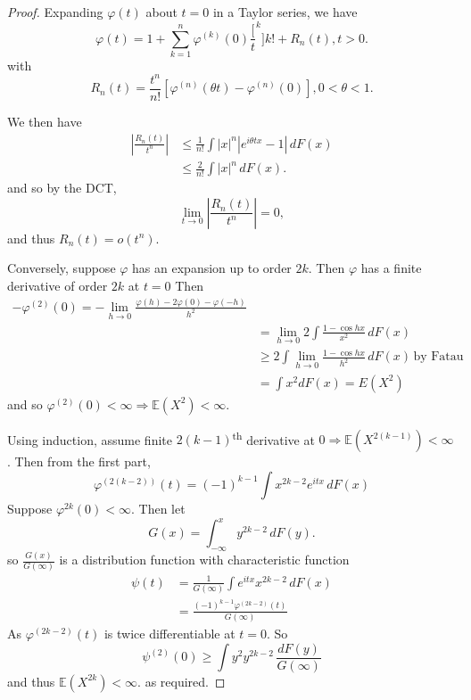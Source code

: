 \documentclass[10pt, oneside, reqno]{amsart}
\theoremstyle{plain}%
\theoremstyle{definition}
\theoremstyle{remark}
\renewcommand{\phi}{\varphi}
\newcommand{\E}{\mathbb{E}}
\newcommand{\sumnk}{\sum_{k=1}^n}
\begin{document}
\begin{proof}
    Expanding $\phi(t)$ about $t = 0$ in a Taylor series, we have \[
        \phi(t) = 1 + \sumnk \phi^{(k)}(0) \frac[t^k]{k!} + R_n(t), t > 0.
    \] with \[
        R_n(t) = \frac{t^n}{n!} \left[ \phi^{(n)}(\theta t) - \phi^{(n)}(0) \right], 0 < \theta < 1.
    \]  
    
    We then have 
    \begin{align*}
        \left| \frac{R_n(t)}{t^n} \right| &\leq \frac{1}{n!} \int |x|^n | e^{i\theta tx} - 1 | \, dF(x) \\
        &\leq \frac{2}{n!} \int |x|^n \, dF(x).
    \end{align*} and so by the DCT, \[
        \lim_{t \rightarrow 0} \left| \frac{R_n(t)}{t^n} \right| = 0, 
    \] and thus $R_n(t) = o(t^n)$.
    
    Conversely, suppose $\phi$ has an expansion up to order $2k$.  Then $\phi$ has a finite derivative of order $2k$ at $t = 0$  Then \begin{align*}
        -\phi^{(2)}(0) = -\lim_{h \rightarrow 0} \frac{ \phi(h) - 2 \phi(0) - \phi(-h)}{h^2} \\
        &= \lim_{h \rightarrow 0} 2 \int \frac{1 - \cos hx}{x^2} \, dF(x) \\
        &\geq 2 \int \lim_{h \rightarrow 0} \frac{1 - \cos hx}{h^2} \, dF(x) \, \text{by Fatau} \\
        &= \int x^2 dF(x) = E(X^2)
    \end{align*} and so $\phi^{(2)}(0) < \infty \Rightarrow \E(X^2) < \infty$.    
    
    Using induction, assume finite $2(k-1)$\textsuperscript{th} derivative at $0 \Rightarrow \E(X^{2(k-1)}) < \infty$.  Then from the first part, \[
        \phi^{(2(k-2))}(t) = (-1)^{k-1} \int x^{2k-2} e^{itx} \, dF(x) 
    \]  Suppose $\phi^{2k}(0) < \infty$.  Then let \[
        G(x) = \int_{-\infty}^x y^{2k-2} \, dF(y).  
    \] so $\frac{G(x)}{G(\infty)}$ is a distribution function with characteristic function \begin{align*}
    \psi(t) &= \frac{1}{G(\infty)} \int e^{itx} x^{2k-2} \, dF(x) \\
            &= \frac{(-1)^{k-1} \phi^{(2k-2)}(t)}{G(\infty)}
    \end{align*}
    As $\phi^{(2k-2)}(t)$ is twice differentiable at $t = 0$.  So \[
        \psi^{(2)}(0) \geq \int y^2 y^{2k-2} \, \frac{dF(y)}{G(\infty)} 
    \] and thus $\E(X^{2k}) < \infty$.  as required.
\end{proof}
\end{document}
